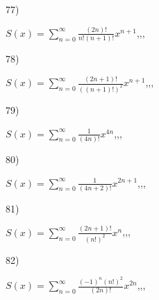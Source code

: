 \documentclass[11pt, ukrainian]{article}
\begin{document}
\par
\vspace{0.9cm}
77) \space 
{%
{$S(x)=\sum\limits_{n=0}^{\infty}{\frac{(2n)!}{n!(n+1)!}}{x^{{n+1}}}$},,, \par \smallskip  
}
\par
\vspace{0.9cm}
78) \space 
{%
{$S(x)=\sum\limits_{n=0}^{\infty}{\frac{(2n+1)!}{((n+1)!)^2}}{x^{{n+1}}}$},,, \par \smallskip  
}
\par
\vspace{0.9cm}
79) \space 
{%
{$S(x)=\sum\limits_{n=0}^{\infty}{\frac{1}{(4n)!}}{x^{{4n}}}$},,, \par \smallskip  
}
\par
\vspace{0.9cm}
80) \space 
{%
{$S(x)=\sum\limits_{n=0}^{\infty}{\frac{1}{(4n+2)!}}{x^{{2n+1}}}$},,, \par \smallskip  
}
\par
\newpage
81) \space 
{%
{$S(x)=\sum\limits_{n=0}^{\infty}{\frac{(2n+1)!}{(n!)^2}}{x^{n}}$},,, \par \smallskip  
}
\par
\vspace{0.9cm}
82) \space 
{%
{$S(x)=\sum\limits_{n=0}^{\infty}{\frac{{(-1)^n}{(n!)^2}}{(2n)!}}{x^{{2n}}}$},,, \par \smallskip  
}
\end{document}
